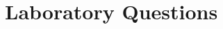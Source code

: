 \documentclass[letterpaper,12pt]{article}
\begin{document}
\section{Laboratory Questions}














\end{document}
